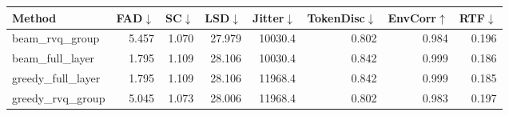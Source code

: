 \begin{tabular}{lrrrrrrr}
\toprule
Method & FAD$\downarrow$ & SC$\downarrow$ & LSD$\downarrow$ & Jitter$\downarrow$ & TokenDisc$\downarrow$ & EnvCorr$\uparrow$ & RTF$\downarrow$ \\
\midrule
beam\_rvq\_group & 5.457 & 1.070 & 27.979 & 10030.4 & 0.802 & 0.984 & 0.196 \\
beam\_full\_layer & 1.795 & 1.109 & 28.106 & 10030.4 & 0.842 & 0.999 & 0.186 \\
greedy\_full\_layer & 1.795 & 1.109 & 28.106 & 11968.4 & 0.842 & 0.999 & 0.185 \\
greedy\_rvq\_group & 5.045 & 1.073 & 28.006 & 11968.4 & 0.802 & 0.983 & 0.197 \\
\bottomrule
\end{tabular}
